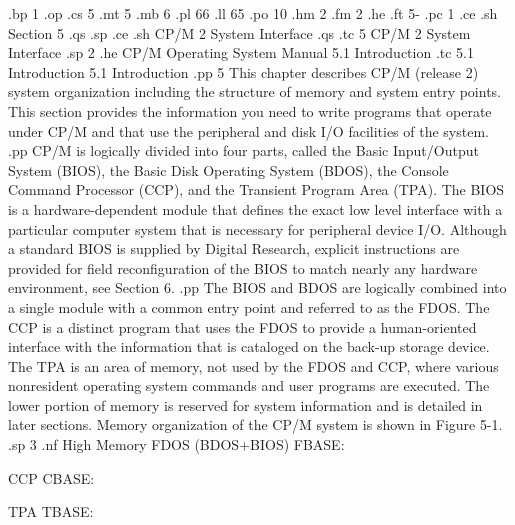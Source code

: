 .bp 1
.op
.cs 5
.mt 5
.mb 6
.pl 66
.ll 65
.po 10
.hm 2
.fm 2
.he
.ft                                5-%
.pc 1
.ce
.sh
Section 5
.qs
.sp
.ce
.sh
CP/M 2 System Interface
.qs
.tc 5  CP/M 2 System Interface
.sp 2
.he CP/M Operating System Manual                    5.1  Introduction
.tc    5.1  Introduction
5.1  Introduction
.pp 5
This chapter describes CP/M (release 2) system organization including the
structure of memory and system entry points.  This section provides
the information you need to write programs that operate under CP/M and
that use the peripheral and disk I/O facilities of the system.
.pp
CP/M is logically divided into four parts, called the Basic Input/Output 
System (BIOS), the Basic Disk Operating System (BDOS), the Console Command
Processor (CCP), and the Transient Program Area (TPA).  The BIOS is a
hardware-dependent module that defines the exact low level interface with a
particular computer system that is necessary for peripheral device I/O.
Although a standard BIOS is supplied by Digital Research, explicit
instructions are provided for field reconfiguration of the BIOS to match
nearly any hardware environment, see Section 6.
.pp
The BIOS and BDOS are
logically combined into a single module with a common entry point and
referred to as the FDOS.  The CCP is a distinct program that uses the FDOS to
provide a human-oriented interface with the information that is cataloged on
the back-up storage device.  The TPA is an area of memory, 
not used by the FDOS and CCP, where various nonresident operating
system commands and user programs are executed.  The lower portion of memory
is reserved for system information and is detailed in later sections.  Memory
organization of the CP/M system is shown in Figure 5-1.
.sp 3
.nf
                  High
                  Memory     FDOS (BDOS+BIOS)
                  FBASE:

                                   CCP
                  CBASE:

                                   TPA
                  TBASE:

